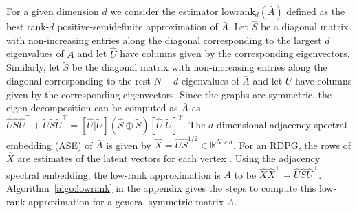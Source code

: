 \documentclass[journal,twoside,web]{ieeecolor}
\renewcommand{\Re}{\mathbb{R}}
\begin{document}


For a given dimension $d$ we consider the estimator $\mathrm{lowrank}_d(\bar{A})$ defined as the best rank-$d$ positive-semidefinite approximation of $\bar{A}$.
Let $\hat{S}$ be a diagonal matrix with non-increasing entries along the diagonal corresponding to the largest $d$ eigenvalues of $\bar{A}$ and let $\hat{U}$ have columns given by the corresponding eigenvectors. Similarly, let $\tilde{S}$ be the diagonal matrix with non-increasing entries along the diagonal corresponding to the rest $N - d$ eigenvalues of $\bar{A}$ and let $\tilde{U}$ have columns given by the corresponding eigenvectors.
Since the graphs are symmetric, the eigen-decomposition can be computed as $\bar{A}$ as $\hat{U} \hat{S} \hat{U}^{\top} + \tilde{U}\tilde{S}\tilde{U}^{\top}=[\hat{U}|\tilde{U}] (\hat{S}\oplus \tilde{S}) [\hat{U}|\tilde{U}]^T$.
The $d$-dimensional adjacency spectral embedding (ASE) of $\bar{A}$ is given by $\hat{X}=\hat{U} \hat{S}^{1/2}\in \Re^{N \times d}$.
For an RDPG, the rows of $\hat{X}$ are estimates of the latent vectors for each vertex \cite{sussman2014consistent}.
Using the adjacency spectral embedding, the low-rank approximation is $\bar{A}$ to be $\hat{X} \hat{X}^{\top}=\hat{U}\hat{S}\hat{U}^{\top}$.
Algorithm~\ref{algo:lowrank} in the appendix gives the steps to compute this low-rank approximation for a general symmetric matrix $A$.
\end{document}
